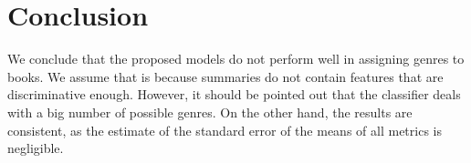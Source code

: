 \documentclass{article}
\begin{document}
\section{Conclusion}
\par We conclude that the proposed models do not perform well in assigning genres to books. We assume that is because summaries do not contain features that are discriminative enough. However, it should be pointed out that the classifier deals with a big number of possible genres. On the other hand, the results are consistent, as the estimate of the standard error of the means of all metrics is negligible.

\printbibliography
\end{document}
